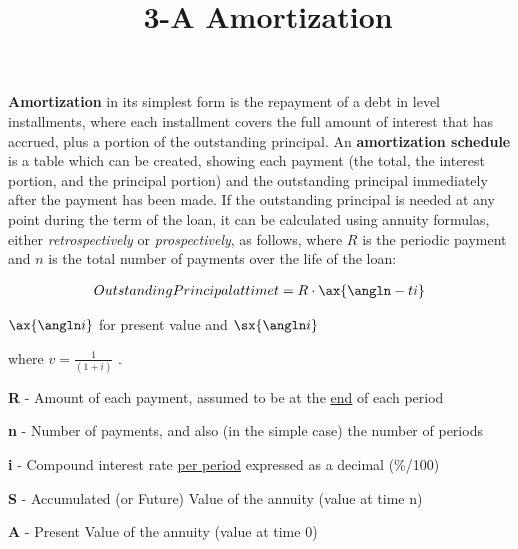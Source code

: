 \documentclass[12pt]{article}
\title{\normalfont\ 3-A Amortization} %
\author{} %
\date{}  %
\begin{document}
\maketitle %

\vspace{-1.1in}

\begin{flushleft}
    \textbf{Amortization} in its simplest form is the repayment of a debt in level installments, where
    each installment covers the full amount of interest that has accrued, plus a portion of the outstanding
    principal.  An \textbf{amortization schedule} is a table which can be created, showing each payment
    (the total, the interest portion, and the principal portion) and the outstanding principal immediately after
    the payment has been made.  If the outstanding principal is needed at any point during the term of
    the loan, it can be calculated using annuity formulas, either \textit{retrospectively} or
    \textit{prospectively}, as follows, where $ R $ is the periodic payment and $ n $ is the total
    number of payments over the life of the loan:
\end{flushleft}

\begin{align*}
    Outstanding Principal at time t & = R \cdot \ax{\angln-t i} \\
\end{align*}
\vspace{-.2in}

{\Large $ \ax{ \angln i} $} for present value and {\Large $ \sx{ \angln i} $}

\begin{flushleft}
    where {\large $ v = \frac{1}{(1+i)} $ }.
\end{flushleft}
\vspace{.1in}


\begin{description}
    \item \textbf{R} - Amount of each payment, assumed to be at the \underline{end} of each period
    \item\textbf{n} - Number of payments, and also (in the simple case) the number of periods
    \item\textbf{i} - Compound interest rate \underline{per period} expressed as a decimal {(\%/100)}
    \item\textbf{S} - Accumulated (or Future) Value of the annuity (value at time n)
    \item\textbf{A} - Present Value of the annuity (value at time 0)
\end{description}
\vspace{.1in}
\end{document}

